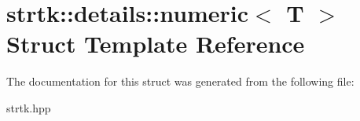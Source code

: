 \hypertarget{structstrtk_1_1details_1_1numeric}{\section{strtk\-:\-:details\-:\-:numeric$<$ T $>$ Struct Template Reference}
\label{structstrtk_1_1details_1_1numeric}
}


The documentation for this struct was generated from the following file\-:\begin{DoxyCompactItemize}
\item 
strtk.\-hpp\end{DoxyCompactItemize}
